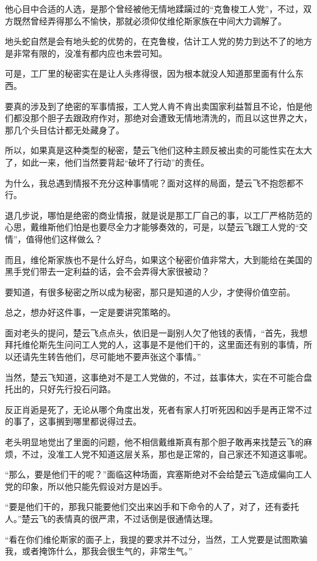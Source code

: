 他心目中合适的人选，是那个曾经被他无情地蹂躏过的“克鲁梭工人党”，不过，双方既然曾经弄得那么不愉快，那就必须仰仗维伦斯家族在中间大力调解了。

地头蛇自然是会有地头蛇的优势的，在克鲁梭，估计工人党的势力到达不了的地方是非常有限的，没准有都内应也未尝可知。

可是，工厂里的秘密实在是让人头疼得很，因为根本就没人知道那里面有什么东西。

要真的涉及到了绝密的军事情报，工人党人肯不肯出卖国家利益暂且不论，怕是他们都没那个胆子去跟政府作对，那绝对会遭致无情地清洗的，而且以这世界之大，那几个头目估计都无处藏身了。

所以，如果真是这种类型的秘密，楚云飞他们这种主顾反被出卖的可能性实在太大了，如此一来，他们当然要背起“破坏了行动”的责任。

为什么，我总遇到情报不充分这种事情呢？面对这样的局面，楚云飞不抱怨都不行。

退几步说，哪怕是绝密的商业情报，就是说是那工厂自己的事，以工厂严格防范的心思，戴维斯他们怕是也要尽全力才能够奏效的，可是，以楚云飞跟工人党的“交情”，值得他们这样做么？

而且，维伦斯家族也不是什么好鸟，如果这个秘密价值非常大，大到能给在美国的黑手党们带去一定利益的话，会不会弄得大家很被动？

要知道，有很多秘密之所以成为秘密，那只是知道的人少，才使得价值空前。

总之，想办好这件事，一定是要讲究策略的。

面对老头的提问，楚云飞点点头，依旧是一副别人欠了他钱的表情，“首先，我想拜托维伦斯先生问问工人党的人，这事是不是他们干的，这里面还有别的事情，所以还请先生转告他们，尽可能地不要声张这个事情。”

当然，楚云飞知道，这事绝对不是工人党做的，不过，兹事体大，实在不可能合盘托出的，只好先行投石问路。

反正肖逅是死了，无论从哪个角度出发，死者有家人打听死因和凶手是再正常不过的事了，这事搁到哪里都说得过去。

老头明显地觉出了里面的问题，他不相信戴维斯真有那个胆子敢再来找楚云飞的麻烦，不过，没准工人党不知道这层关系，那也是正常的，自己家还不知道这事呢。

“那么，要是他们干的呢？”面临这种场面，宾塞斯绝对不会给楚云飞造成偏向工人党的印象，所以他只能先假设对方是凶手。

“要是他们干的，那我只能要他们交出来凶手和下命令的人了，对了，还有委托人。”楚云飞的表情真的很严肃，不过话倒是很通情达理。

“看在你们维伦斯家的面子上，我提的要求并不过分，当然，工人党要是试图欺骗我，或者掩饰什么，那我会很生气的，非常生气。”

